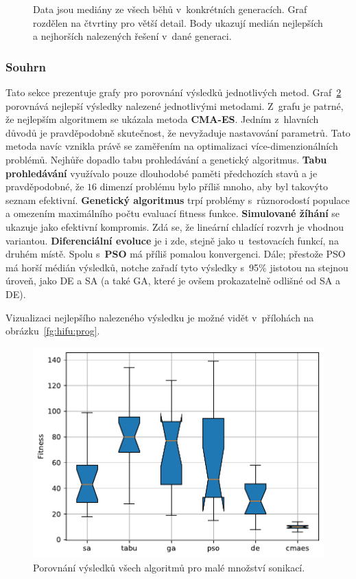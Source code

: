 \begin{figure}[H]
{\begin{tabular}{cc}
    \end{tabular}
    }
    \caption{Data jsou mediány ze všech běhů v~konkrétních generacích. Graf rozdělen na čtvrtiny pro větší detail. Body ukazují medián nejlepších a nejhorších nalezených řešení v~dané generaci.}
    \label{fg:hifu:cmaes:evoProg}
\end{figure}

\subsubsection{Souhrn}
Tato sekce prezentuje grafy pro porovnání výsledků jednotlivých metod. Graf~\ref{fg:hifu:all:best} porovnává nejlepší výsledky nalezené jednotlivými metodami. Z~grafu je patrné, že nejlepším algoritmem se ukázala metoda \textbf{CMA-ES}. Jedním z~hlavních důvodů je pravděpodobně skutečnost, že nevyžaduje nastavování parametrů. Tato metoda navíc vznikla právě se zaměřením na optimalizaci více-dimenzionálních problémů. Nejhůře dopadlo tabu prohledávání a genetický algoritmus. \textbf{Tabu prohledávání} využívalo pouze dlouhodobé paměti předchozích stavů a je pravděpodobné, že $16$ dimenzí problému bylo příliš mnoho, aby byl takovýto seznam efektivní. \textbf{Genetický algoritmus} trpí problémy s~různorodostí populace a omezením maximálního počtu evaluací fitness funkce. \textbf{Simulované žíhání} se ukazuje jako efektivní kompromis. Zdá se, že lineární chladící rozvrh je vhodnou variantou. \textbf{Diferenciální evoluce} je i zde, stejně jako u~testovacích funkcí, na druhém místě. Spolu s~\textbf{PSO} má příliš pomalou konvergenci. Dále; přestože PSO má horší médián výsledků, notche zařadí tyto výsledky s~95\% jistotou na stejnou úroveň, jako DE a SA (a také GA, které je ovšem prokazatelně odlišné od SA a DE). 

Vizualizaci nejlepšího nalezeného výsledku je možné vidět v~přílohách na obrázku~\ref{fg:hifu:prog}.

\begin{figure}[H]
    \centering
    \includegraphics[width=0.6\linewidth]{obrazky-figures/statistics/HIFU/blob/4/JOINED/solutionsPlotsComparasion.pdf}
    \caption{Porovnání výsledků všech algoritmů pro malé množství sonikací.}
    \label{fg:hifu:all:best}
\end{figure}        

